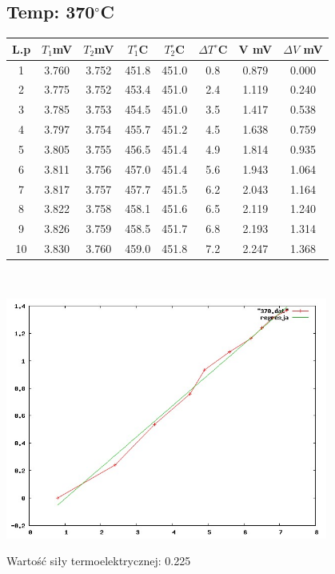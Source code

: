 \documentclass[a4paper,12pt]{article}
\begin{document}
\subsection{Temp: 370$^\circ$C}
\begin{tabular}{|c|c|c|c|c|c|c|c|}
\hline
L.p&$T_1$mV&$T_2$mV&$T_1^\circ$C&$T_2^\circ$C&$\Delta T^\circ$C&V mV&$\Delta V$ mV\\
\hline
1&3.760&3.752&451.8&451.0&0.8&0.879&0.000\\
2&3.775&3.752&453.4&451.0&2.4&1.119&0.240\\
3&3.785&3.753&454.5&451.0&3.5&1.417&0.538\\
4&3.797&3.754&455.7&451.2&4.5&1.638&0.759\\
5&3.805&3.755&456.5&451.4&4.9&1.814&0.935\\
6&3.811&3.756&457.0&451.4&5.6&1.943&1.064\\
7&3.817&3.757&457.7&451.5&6.2&2.043&1.164\\
8&3.822&3.758&458.1&451.6&6.5&2.119&1.240\\
9&3.826&3.759&458.5&451.7&6.8&2.193&1.314\\
10&3.830&3.760&459.0&451.8&7.2&2.247&1.368\\
\hline
\end{tabular}\\
\begin{center}
\includegraphics[width=400px]{370}
\end{center}

Wartość siły termoelektrycznej: 0.225
\end{document}
